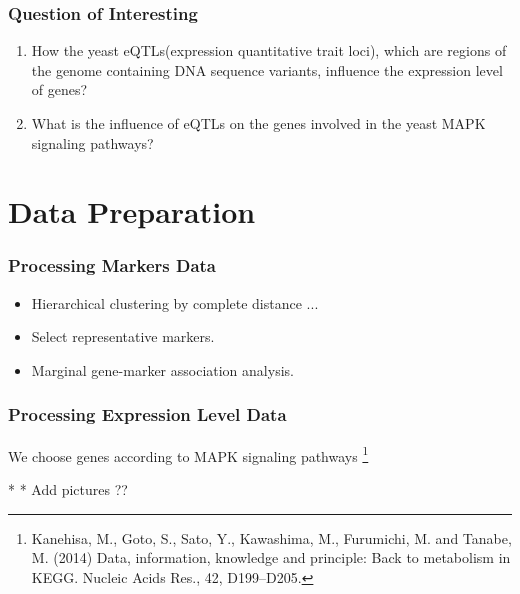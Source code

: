 \begin{frame}\frametitle{Question of Interesting}
    \begin{enumerate}
        \item How the yeast eQTLs(expression quantitative trait loci), which are regions of the genome containing DNA sequence variants, influence the expression level of genes? 
        \item What is the influence of eQTLs on the genes involved in the yeast MAPK signaling pathways?
    \end{enumerate}
    

\end{frame}


\section{Data Preparation}
\begin{frame}
    \sectionpage
\end{frame}

\begin{frame}
    \frametitle{Processing Markers Data}

    \begin{itemize}
        \item Hierarchical clustering by complete distance ...
        \item Select representative markers.
        \item Marginal gene-marker association analysis.
    \end{itemize}
\end{frame}

\begin{frame}
    \frametitle{Processing Expression Level Data}

    We choose genes according to MAPK signaling pathways \footnote[2]{Kanehisa, M., Goto, S., Sato, Y., Kawashima, M., Furumichi, M. and Tanabe, M. (2014) Data, information, knowledge and principle: Back to metabolism in KEGG. Nucleic Acids Res., 42, D199–D205.}

    * * Add pictures ?? 
\end{frame}